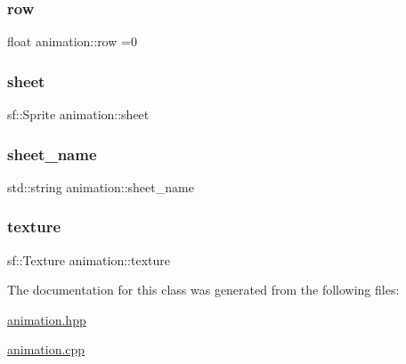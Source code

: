 \mbox{\label{classanimation_adaa2321a124fb03b2f4b3bd7af4e2127}} 
\subsubsection{\texorpdfstring{row}{row}}
{\footnotesize\ttfamily float animation\+::row =0\hspace{0.3cm}{\ttfamily [private]}}

\mbox{\label{classanimation_aa72ba079cfcb62b5dd7f6d74a9438516}} 
\subsubsection{\texorpdfstring{sheet}{sheet}}
{\footnotesize\ttfamily sf\+::\+Sprite animation\+::sheet\hspace{0.3cm}{\ttfamily [private]}}

\mbox{\label{classanimation_a5406569ef9a8e47a8e50a927063613f6}} 
\subsubsection{\texorpdfstring{sheet\+\_\+name}{sheet\_name}}
{\footnotesize\ttfamily std\+::string animation\+::sheet\+\_\+name\hspace{0.3cm}{\ttfamily [private]}}

\mbox{\label{classanimation_a9b49e5a7b856d127ea5481998c911fde}} 
\subsubsection{\texorpdfstring{texture}{texture}}
{\footnotesize\ttfamily sf\+::\+Texture animation\+::texture\hspace{0.3cm}{\ttfamily [private]}}



The documentation for this class was generated from the following files\+:\begin{DoxyCompactItemize}
\item 
\hyperlink{animation_8hpp}{animation.\+hpp}\item 
\hyperlink{animation_8cpp}{animation.\+cpp}\end{DoxyCompactItemize}
